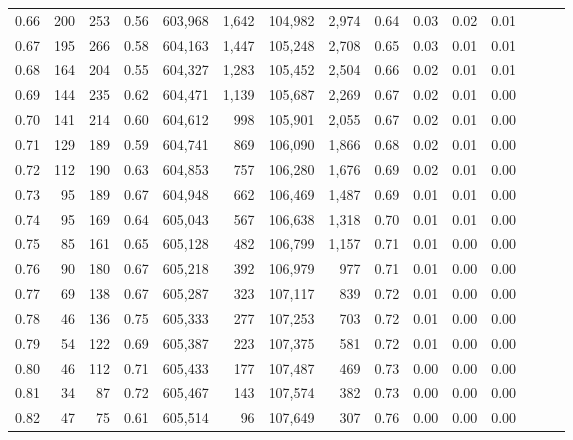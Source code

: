 \begin{tabular}{rrrrrrrrrrrrrrr}
0.66 &     200 &    253 &  0.56 &  603,968 &    1,642 &  104,982 &    2,974 &  0.64 &  0.03 &  0.02 &      0.01 \\
0.67 &     195 &    266 &  0.58 &  604,163 &    1,447 &  105,248 &    2,708 &  0.65 &  0.03 &  0.01 &      0.01 \\
0.68 &     164 &    204 &  0.55 &  604,327 &    1,283 &  105,452 &    2,504 &  0.66 &  0.02 &  0.01 &      0.01 \\
0.69 &     144 &    235 &  0.62 &  604,471 &    1,139 &  105,687 &    2,269 &  0.67 &  0.02 &  0.01 &      0.00 \\
0.70 &     141 &    214 &  0.60 &  604,612 &      998 &  105,901 &    2,055 &  0.67 &  0.02 &  0.01 &      0.00 \\
0.71 &     129 &    189 &  0.59 &  604,741 &      869 &  106,090 &    1,866 &  0.68 &  0.02 &  0.01 &      0.00 \\
0.72 &     112 &    190 &  0.63 &  604,853 &      757 &  106,280 &    1,676 &  0.69 &  0.02 &  0.01 &      0.00 \\
0.73 &      95 &    189 &  0.67 &  604,948 &      662 &  106,469 &    1,487 &  0.69 &  0.01 &  0.01 &      0.00 \\
0.74 &      95 &    169 &  0.64 &  605,043 &      567 &  106,638 &    1,318 &  0.70 &  0.01 &  0.01 &      0.00 \\
0.75 &      85 &    161 &  0.65 &  605,128 &      482 &  106,799 &    1,157 &  0.71 &  0.01 &  0.00 &      0.00 \\
0.76 &      90 &    180 &  0.67 &  605,218 &      392 &  106,979 &      977 &  0.71 &  0.01 &  0.00 &      0.00 \\
0.77 &      69 &    138 &  0.67 &  605,287 &      323 &  107,117 &      839 &  0.72 &  0.01 &  0.00 &      0.00 \\
0.78 &      46 &    136 &  0.75 &  605,333 &      277 &  107,253 &      703 &  0.72 &  0.01 &  0.00 &      0.00 \\
0.79 &      54 &    122 &  0.69 &  605,387 &      223 &  107,375 &      581 &  0.72 &  0.01 &  0.00 &      0.00 \\
0.80 &      46 &    112 &  0.71 &  605,433 &      177 &  107,487 &      469 &  0.73 &  0.00 &  0.00 &      0.00 \\
0.81 &      34 &     87 &  0.72 &  605,467 &      143 &  107,574 &      382 &  0.73 &  0.00 &  0.00 &      0.00 \\
0.82 &      47 &     75 &  0.61 &  605,514 &       96 &  107,649 &      307 &  0.76 &  0.00 &  0.00 &      0.00 \\

\end{tabular}
